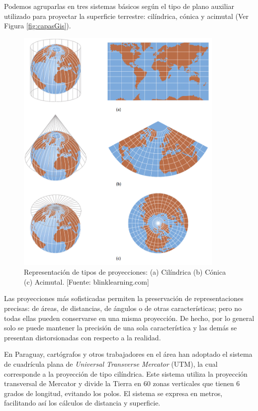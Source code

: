 
Podemos agruparlas en tres sistemas básicos según el tipo de plano auxiliar utilizado para proyectar la superficie terrestre: cilíndrica, cónica y acimutal (Ver Figura \ref{fig:capasGis}).

\begin{figure}[H]
    \centering
    \includegraphics[width=10cm]{Chapter3/Chapter3Figs/CoordenadasProyectadas.png}
    \caption{Representación de tipos de proyecciones: (a) Cilíndrica (b) Cónica (c) Acimutal. [Fuente: blinklearning.com]}
    \label{fig:mapaCoordenadasGeograficas}
\end{figure}

Las proyecciones más sofisticadas permiten la preservación de representaciones precisas: de áreas, de distancias, de ángulos o de otras características; pero no todas ellas pueden conservarse en una misma proyección. De hecho, por lo general solo se puede mantener la  precisión de una sola característica y las demás se presentan distorsionadas con respecto a la realidad.

En Paraguay, cartógrafos y otros trabajadores en el área han adoptado el sistema de cuadrícula plana de \textit{Universal Transverse Mercator} (UTM), la cual corresponde a la proyección de tipo cilíndrica. Este sistema utiliza la proyección transversal de Mercator y divide la Tierra en 60 zonas verticales que tienen 6 grados de longitud, evitando los polos. El sistema se expresa en metros, facilitando así los cálculos de distancia y superficie.

